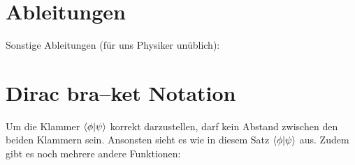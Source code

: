 \section{Ableitungen}
Sonstige Ableitungen (für uns Physiker unüblich):

\section{Dirac bra--ket Notation}
Um die Klammer $\bra{\phi}\ket{\psi}$ korrekt darzustellen, darf kein Abstand zwischen den beiden Klammern sein. Ansonsten sieht es wie in diesem Satz $\bra{\phi} \ket{\psi}$ aus. Zudem gibt es noch mehrere andere Funktionen:

